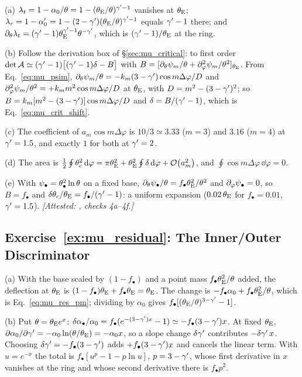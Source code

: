 (a) $\lambda_t = 1-\alpha_0/\theta = 1-(\theta_{\mathrm{E}}/\theta)^{\gamma'-1}$
vanishes at $\theta_{\mathrm{E}}$; $\lambda_r = 1-\alpha_0' = 1-(2-\gamma')
(\theta_{\mathrm{E}}/\theta)^{\gamma'-1}$ equals $\gamma'-1$ there; and
$\partial_\theta\lambda_t = (\gamma'-1)\theta_{\mathrm{E}}^{\gamma'-1}\theta^{-\gamma'}$, which
is $(\gamma'-1)/\theta_{\mathrm{E}}$ at the ring.

(b) Follow the derivation box of \S\ref{sec:mu_critical}: to
first order $\det\mathcal{A} \simeq (\gamma'-1)\big[(\gamma'-1)\delta - B\big]$ with
$B = [\partial_\theta\psi_m/\theta + \partial_\varphi^2\psi_m/\theta^2]_{\theta_{\mathrm{E}}}$.
From Eq.~\eqref{eq:mu_psim},
$\partial_\theta\psi_m/\theta = -k_m(3-\gamma')\cos m\Delta\varphi/D$ and
$\partial_\varphi^2\psi_m/\theta^2 = +k_m m^2\cos m\Delta\varphi/D$ at
$\theta_{\mathrm{E}}$, with $D=m^2-(3-\gamma')^2$; so $B = k_m[m^2-(3-\gamma')]\cos
m\Delta\varphi/D$ and $\delta = B/(\gamma'-1)$, which is
Eq.~\eqref{eq:mu_crit_shift}.

(c) The coefficient of $a_m\cos m\Delta\varphi$ is
$10/3\simeq3.33$ ($m=3$) and $3.16$ ($m=4$) at $\gamma'=1.5$, and exactly
$1$ for both at $\gamma'=2$.

(d) The area is $\tfrac12\oint\theta_c^2\,\dd\varphi =
\pi\theta_{\mathrm{E}}^2 + \theta_{\mathrm{E}}^2\oint\delta\,\dd\varphi + \mathcal{O}\!\left(a_m^2\right)$, and
$\oint\cos m\Delta\varphi\,\dd\varphi = 0$.

(e) With $\psi_\bullet = \theta_{\bullet}^2\ln\theta$ on a fixed base,
$\partial_\theta\psi_\bullet/\theta = f_\bullet\theta_{\mathrm{E}}^2/\theta^2$ and
$\partial_\varphi\psi_\bullet=0$, so $B = f_\bullet$ and
$\delta\theta_c/\theta_{\mathrm{E}} = f_\bullet/(\gamma'-1)$: a uniform expansion
($0.02\,\theta_{\mathrm{E}}$ for $f_\bullet=0.01$, $\gamma'=1.5$).
\emph{[Attested: ,
checks 4a--4f.]}

\subsection*{Exercise~\ref{ex:mu_residual}: The Inner/Outer Discriminator}

(a) With the base scaled by $(1-f_\bullet)$ and a point mass
$f_\bullet\theta_{\mathrm{E}}^2/\theta$ added, the deflection at $\theta_{\mathrm{E}}$ is
$(1-f_\bullet)\theta_{\mathrm{E}} + f_\bullet\theta_{\mathrm{E}} = \theta_{\mathrm{E}}$.  The change is
$-f_\bullet\alpha_0 + f_\bullet\theta_{\mathrm{E}}^2/\theta$, which is
Eq.~\eqref{eq:mu_res_pm}; dividing by $\alpha_0$ gives
$f_\bullet[(\theta_{\mathrm{E}}/\theta)^{3-\gamma'}-1]$.

(b) Put $\theta = \theta_{\mathrm{E}} e^x$:
$\delta\alpha_\bullet/\alpha_0 = f_\bullet(e^{-(3-\gamma')x}-1) \simeq
-f_\bullet(3-\gamma')x$.  At fixed $\theta_{\mathrm{E}}$,
$\partial\alpha_0/\partial\gamma' = -\alpha_0\ln(\theta/\theta_{\mathrm{E}}) =
-\alpha_0 x$, so a slope change $\delta\gamma'$ contributes $-\delta\gamma'\,x$.
Choosing $\delta\gamma' = -f_\bullet(3-\gamma')$ adds $+f_\bullet(3-\gamma')x$ and
cancels the linear term.  With $u=e^{-x}$ the total is
$f_\bullet[u^p-1-p\ln u]$, $p=3-\gamma'$, whose first derivative in $x$
vanishes at the ring and whose second derivative there is
$f_\bullet p^2$.

